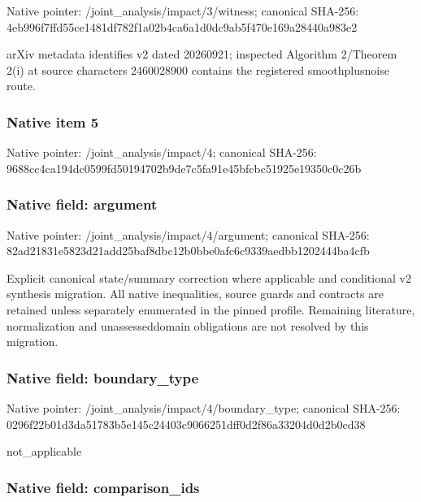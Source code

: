 \documentclass[10pt,a4paper]{article}
\begin{document}
Native pointer: /joint\_analysis/impact/3/witness; canonical SHA-256: 4eb996f7ffd55ce1481df782\allowbreak{}f1a02b4ca6a1d0dc9ab5f470\allowbreak{}e169a28440a983e2


arXiv metadata identifies v2 dated 20260921; inspected Algorithm 2/Theorem 2(i) at source characters 2460028900 contains the registered smoothplusnoise route.


\subsubsection{Native item 5}


Native pointer: /joint\_analysis/impact/4; canonical SHA-256: 9688cc4ca194dc0599fd5019\allowbreak{}4702b9de7c5fa91e45bfcbc5\allowbreak{}1925e19350c0c26b



\subsubsection{Native field: argument}


Native pointer: /joint\_analysis/impact/4/argument; canonical SHA-256: 82ad21831e5823d21add25ba\allowbreak{}f8dbc12b0bbe0afc6c9339ae\allowbreak{}dbb1202444ba4cfb


Explicit canonical state/summary correction where applicable and conditional v2 synthesis migration. All native inequalities, source guards and contracts are retained unless separately enumerated in the pinned profile. Remaining literature, normalization and unassesseddomain obligations are not resolved by this migration.


\subsubsection{Native field: boundary\_type}


Native pointer: /joint\_analysis/impact/4/boundary\_type; canonical SHA-256: 0296f22b01d3da51783b5e14\allowbreak{}5c24403c9066251dff0d2f86\allowbreak{}a33204d0d2b0cd38


not\_applicable


\subsubsection{Native field: comparison\_ids}
\end{document}

